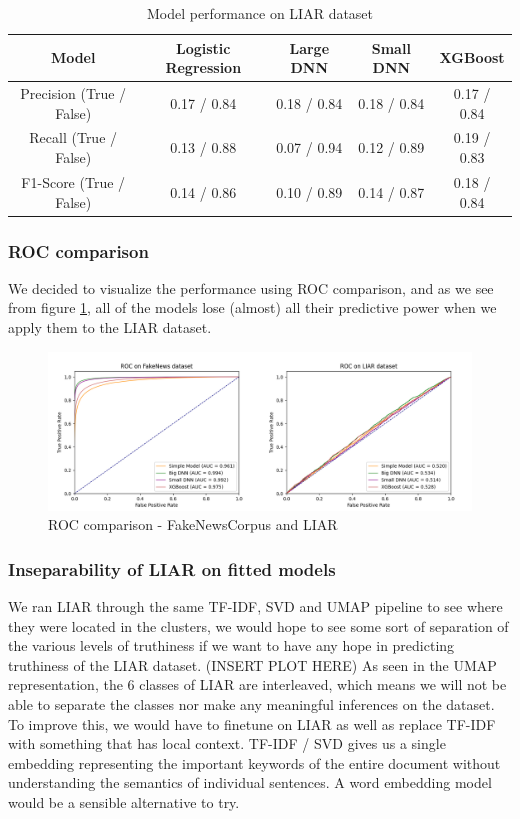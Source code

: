 \begin{table}[htpb]
  \centering
  \caption{Model performance on LIAR dataset}
  \label{tab:liarperformance}
  \begin{tabular}{c|cccc}
    Model & Logistic Regression & Large DNN & Small DNN & XGBoost \\ \hline
    Precision (True / False) & 0.17 / 0.84  & 0.18 / 0.84 & 0.18 / 0.84 & 0.17 / 0.84 \\ \hline
    Recall (True / False) & 0.13 / 0.88 & 0.07 / 0.94 & 0.12 / 0.89 & 0.19 / 0.83 \\ \hline
    F1-Score (True / False) & 0.14 / 0.86 & 0.10 / 0.89 & 0.14 / 0.87 & 0.18 / 0.84 \\ \hline
  \end{tabular}
\end{table}

\subsubsection{ROC comparison}
We decided to visualize the performance using ROC comparison, and as we see from figure \ref{fig:roc}, all of the models lose
(almost) all their predictive power when we apply them to the LIAR dataset.

\begin{figure}[htpb]
  \centering
  \includegraphics[width=1\textwidth]{figures/ROC_combined}
  \caption{ROC comparison - FakeNewsCorpus and LIAR}
  \label{fig:roc}
\end{figure}


\subsubsection{Inseparability of LIAR on fitted models}
We ran LIAR through the same TF-IDF, SVD and UMAP pipeline to see where they were located in the clusters, we would hope to see some sort of separation of the various levels of truthiness if we want to have any hope in predicting truthiness of the LIAR dataset. (INSERT PLOT HERE) As seen in the UMAP representation, the 6 classes of LIAR are interleaved, which means we will not be able to separate the classes nor make any meaningful inferences on the dataset. To improve this, we would have to finetune on LIAR as well as replace TF-IDF with something that has local context. TF-IDF / SVD gives us a single embedding representing the important keywords of the entire document without understanding the semantics of individual sentences. A word embedding model would be a sensible alternative to try.


